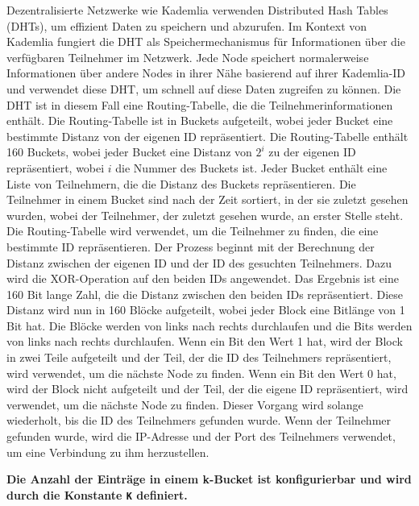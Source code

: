 Dezentralisierte Netzwerke wie Kademlia verwenden Distributed Hash Tables (DHTs), um effizient Daten zu speichern und abzurufen. Im Kontext von Kademlia fungiert die DHT als Speichermechanismus für Informationen über die verfügbaren Teilnehmer im Netzwerk. Jede Node speichert normalerweise Informationen über andere Nodes in ihrer Nähe basierend auf ihrer Kademlia-ID und verwendet diese DHT, um schnell auf diese Daten zugreifen zu können. Die DHT ist in diesem Fall eine Routing-Tabelle, die die Teilnehmerinformationen enthält. Die Routing-Tabelle ist in Buckets aufgeteilt, wobei jeder Bucket eine bestimmte Distanz von der eigenen ID repräsentiert. Die Routing-Tabelle enthält 160 Buckets, wobei jeder Bucket eine Distanz von $2^{i}$ zu der eigenen ID repräsentiert, wobei $i$ die Nummer des Buckets ist. Jeder Bucket enthält eine Liste von Teilnehmern, die die Distanz des Buckets repräsentieren. Die Teilnehmer in einem Bucket sind nach der Zeit sortiert, in der sie zuletzt gesehen wurden, wobei der Teilnehmer, der zuletzt gesehen wurde, an erster Stelle steht. Die Routing-Tabelle wird verwendet, um die Teilnehmer zu finden, die eine bestimmte ID repräsentieren. Der Prozess beginnt mit der Berechnung der Distanz zwischen der eigenen ID und der ID des gesuchten Teilnehmers. Dazu wird die XOR-Operation auf den beiden IDs angewendet. Das Ergebnis ist eine 160 Bit lange Zahl, die die Distanz zwischen den beiden IDs repräsentiert. Diese Distanz wird nun in 160 Blöcke aufgeteilt, wobei jeder Block eine Bitlänge von 1 Bit hat. Die Blöcke werden von links nach rechts durchlaufen und die Bits werden von links nach rechts durchlaufen. Wenn ein Bit den Wert 1 hat, wird der Block in zwei Teile aufgeteilt und der Teil, der die ID des Teilnehmers repräsentiert, wird verwendet, um die nächste Node zu finden. Wenn ein Bit den Wert 0 hat, wird der Block nicht aufgeteilt und der Teil, der die eigene ID repräsentiert, wird verwendet, um die nächste Node zu finden. Dieser Vorgang wird solange wiederholt, bis die ID des Teilnehmers gefunden wurde. Wenn der Teilnehmer gefunden wurde, wird die IP-Adresse und der Port des Teilnehmers verwendet, um eine Verbindung zu ihm herzustellen.

\textbf{Die Anzahl der Einträge in einem k-Bucket ist konfigurierbar und wird durch die Konstante \texttt{K} definiert.}